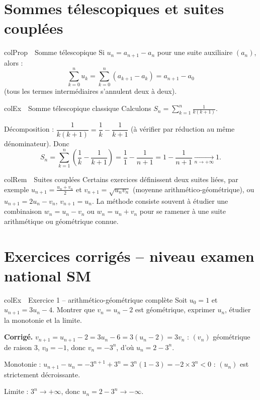 \documentclass[11pt,a4paper]{article}
\newenvironment{propriete}[1][Propriété]
  {\begin{fiche}{colProp}{\ding{72}~~#1}}{\end{fiche}}
\newenvironment{exemple}[1][Exemple]
  {\begin{fiche}{colEx}{\ding{217}~~#1}}{\end{fiche}}
\newenvironment{remarque}[1][Remarque]
  {\begin{fiche}{colRem}{\ding{43}~~#1}}{\end{fiche}}
\begin{document}
\section{Sommes télescopiques et suites couplées}

\begin{propriete}[Somme télescopique]
Si $u_n = a_{n+1} - a_n$ pour une suite auxiliaire $(a_n)$, alors :
\[
  \sum_{k=0}^{n} u_k = \sum_{k=0}^{n} (a_{k+1} - a_k) = a_{n+1} - a_0
\]
(tous les termes intermédiaires s'annulent deux à deux).
\end{propriete}

\begin{exemple}[Somme télescopique classique]
Calculons $S_n = \displaystyle\sum_{k=1}^{n} \frac{1}{k(k+1)}$.

\smallskip
Décomposition : $\dfrac{1}{k(k+1)} = \dfrac{1}{k} - \dfrac{1}{k+1}$ (à vérifier par réduction au même dénominateur). Donc
\[
  S_n = \sum_{k=1}^{n} \left(\frac{1}{k} - \frac{1}{k+1}\right) = \frac{1}{1} - \frac{1}{n+1} = 1 - \frac{1}{n+1} \xrightarrow[n \to +\infty]{} 1.
\]
\end{exemple}

\begin{remarque}[Suites couplées]
Certains exercices définissent deux suites liées, par exemple $u_{n+1} = \frac{u_n+v_n}{2}$ et $v_{n+1} = \sqrt{u_n v_n}$ (moyenne arithmético-géométrique), ou $u_{n+1} = 2u_n - v_n$, $v_{n+1} = u_n$. La méthode consiste souvent à étudier une combinaison $w_n = u_n - v_n$ ou $w_n = u_n + v_n$ pour se ramener à une suite arithmétique ou géométrique connue.
\end{remarque}

\section{Exercices corrigés -- niveau examen national SM}

\begin{exemple}[Exercice 1 -- arithmético-géométrique complète]
Soit $u_0 = 1$ et $u_{n+1} = 3u_n - 4$. Montrer que $v_n = u_n - 2$ est géométrique, exprimer $u_n$, étudier la monotonie et la limite.

\smallskip
\textbf{Corrigé.} $v_{n+1} = u_{n+1} - 2 = 3u_n - 6 = 3(u_n - 2) = 3v_n$ : $(v_n)$ géométrique de raison $3$, $v_0 = -1$, donc $v_n = -3^n$, d'où $u_n = 2 - 3^n$.

\smallskip
Monotonie : $u_{n+1} - u_n = -3^{n+1} + 3^n = 3^n(1 - 3) = -2\times 3^n < 0$ : $(u_n)$ est strictement décroissante.

\smallskip
Limite : $3^n \to +\infty$, donc $u_n = 2 - 3^n \to -\infty$.
\end{exemple}
\end{document}
